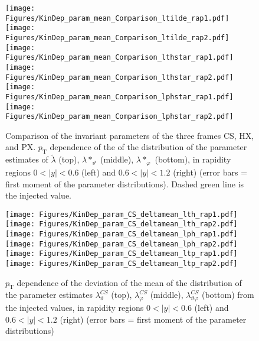 \documentclass[12pt]{article}
\newcommand{\pT}{p_\mathrm{T}}
\newcommand{\absy}{\left |  y \right |}
\newcommand{\lamtilde}{\tilde{\lambda}}
\newcommand{\lamthstar}{\lambda*_\vartheta}
\newcommand{\lamphstar}{\lambda*_\varphi}
\newcommand{\lamthCS}{\lambda^{\scriptscriptstyle CS}_\vartheta}
\newcommand{\lamphCS}{\lambda^{\scriptscriptstyle CS}_\varphi}
\newcommand{\lamthphCS}{\lambda^{\scriptscriptstyle CS}_{\vartheta \varphi}}
\begin{document}




\begin{figure}[htbp]
\centering
\texttt{[image: Figures/KinDep\_param\_mean\_Comparison\_ltilde\_rap1.pdf]}
\texttt{[image: Figures/KinDep\_param\_mean\_Comparison\_ltilde\_rap2.pdf]}
\texttt{[image: Figures/KinDep\_param\_mean\_Comparison\_lthstar\_rap1.pdf]}
\texttt{[image: Figures/KinDep\_param\_mean\_Comparison\_lthstar\_rap2.pdf]}
\texttt{[image: Figures/KinDep\_param\_mean\_Comparison\_lphstar\_rap1.pdf]}
\texttt{[image: Figures/KinDep\_param\_mean\_Comparison\_lphstar\_rap2.pdf]}
\caption{Comparison of the invariant parameters of the three frames CS, HX,
and PX. $\pT$ dependence of the of the distribution of the
parameter estimates of $\lamtilde$ (top), $\lamthstar$ (middle), $\lamphstar$ (bottom), in rapidity regions $0<\absy<0.6$ (left) and
$0.6<\absy<1.2$ (right) (error bars = first moment of the parameter
distributions). Dashed green line is the injected value.}
\end{figure}
\clearpage











\begin{figure}[htbp]
\centering
\texttt{[image: Figures/KinDep\_param\_CS\_deltamean\_lth\_rap1.pdf]}
\texttt{[image: Figures/KinDep\_param\_CS\_deltamean\_lth\_rap2.pdf]}
\texttt{[image: Figures/KinDep\_param\_CS\_deltamean\_lph\_rap1.pdf]}
\texttt{[image: Figures/KinDep\_param\_CS\_deltamean\_lph\_rap2.pdf]}
\texttt{[image: Figures/KinDep\_param\_CS\_deltamean\_ltp\_rap1.pdf]}
\texttt{[image: Figures/KinDep\_param\_CS\_deltamean\_ltp\_rap2.pdf]}
\caption{$\pT$ dependence of the deviation of the mean of the distribution of
the parameter estimates $\lamthCS$ (top), $\lamphCS$ (middle), $\lamthphCS$
(bottom) from the injected values, in rapidity regions $0<\absy<0.6$ (left) and
$0.6<\absy<1.2$ (right) (error bars = first moment of the parameter
distributions)}
\end{figure}
\clearpage
\end{document}
